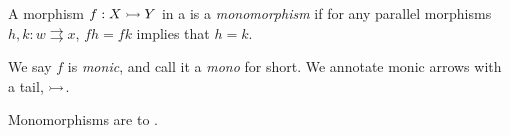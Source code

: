 


\begin{dfn*}[Monomorphism]
	A morphism $f: X\rightarrowtail Y$ in a  is a \emph{monomorphism} if
	for any parallel morphisms $h,k: w\rightrightarrows x$, $fh = fk$ implies that
	$h = k$.
\end{dfn*}

\begin{notation}
	We say $f$ is \emph{monic}, and call it a \emph{mono} for short. We annotate
	monic arrows with a tail, $\rightarrowtail$.
\end{notation}

Monomorphisms are  to .


